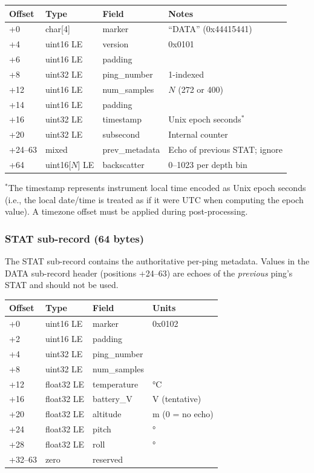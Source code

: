 \begin{tabular}{llll}
\hline
Offset & Type & Field & Notes \\
\hline
+0 & char[4] & marker & ``DATA'' (0x44415441) \\
+4 & uint16 LE & version & 0x0101 \\
+6 & uint16 LE & padding & \\
+8 & uint32 LE & ping\_number & 1-indexed \\
+12 & uint16 LE & num\_samples & $N$ (272 or 400) \\
+14 & uint16 LE & padding & \\
+16 & uint32 LE & timestamp & Unix epoch seconds$^*$ \\
+20 & uint32 LE & subsecond & Internal counter \\
+24--63 & mixed & prev\_metadata & Echo of previous STAT; ignore \\
+64 & uint16[$N$] LE & backscatter & 0--1023 per depth bin \\
\hline
\end{tabular}

$^*$The timestamp represents instrument local time encoded as Unix
epoch seconds (i.e., the local date/time is treated as if it were UTC
when computing the epoch value). A timezone offset must be applied
during post-processing.

\subsubsection{STAT sub-record (64 bytes)}

The STAT sub-record contains the authoritative per-ping metadata.
Values in the DATA sub-record header (positions +24--63) are echoes
of the \emph{previous} ping's STAT and should not be used.

\begin{tabular}{llll}
\hline
Offset & Type & Field & Units \\
\hline
+0 & uint16 LE & marker & 0x0102 \\
+2 & uint16 LE & padding & \\
+4 & uint32 LE & ping\_number & \\
+8 & uint32 LE & num\_samples & \\
+12 & float32 LE & temperature & \si{\celsius} \\
+16 & float32 LE & battery\_V & \si{\volt} (tentative) \\
+20 & float32 LE & altitude & \si{\meter} (0 = no echo) \\
+24 & float32 LE & pitch & \si{\degree} \\
+28 & float32 LE & roll & \si{\degree} \\
+32--63 & zero & reserved & \\
\hline
\end{tabular}

